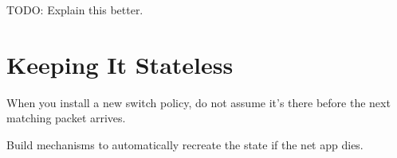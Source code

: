 TODO: Explain this better.  

\section{Keeping It Stateless}
\label{section:stateless}

\begin{principle}
When you install a new switch policy, do not assume it's there before the next matching packet arrives.
\end{principle}

\begin{principle}
Build mechanisms to automatically recreate the state if the net app dies.
\end{principle}